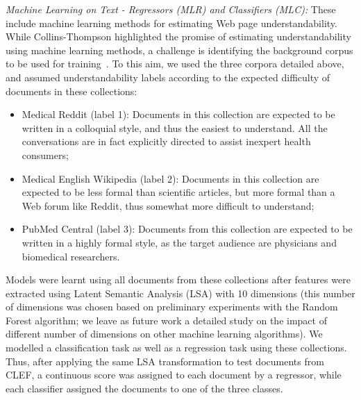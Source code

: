 

\textit{Machine Learning on Text - Regressors (MLR) and Classifiers (MLC):} These include machine learning methods for estimating Web page understandability. While Collins-Thompson highlighted the promise of estimating understandability using machine learning methods, a challenge is identifying the background corpus to be used for training~\cite{collins2014computational}. To this aim, we used the three corpora detailed above, and assumed understandability labels according to the expected difficulty of documents in these collections:

\begin{itemize}[leftmargin=*]
    \item Medical Reddit (label 1): Documents in this collection are expected to be written in a colloquial style, and thus the easiest to understand. All the conversations are in fact explicitly directed to assist inexpert health consumers;
    \item Medical English Wikipedia (label 2): Documents in this collection are expected to be less formal than scientific articles, but more formal than a Web forum like Reddit, thus somewhat more difficult to understand;
    \item PubMed Central (label 3): Documents from this collection are expected to be written in a highly formal style, as the target audience are physicians and biomedical researchers.
\end{itemize}

Models were learnt using all documents from these collections after features were extracted using Latent Semantic Analysis (LSA) with 10 dimensions (this number of dimensions was chosen based on preliminary experiments with the Random Forest algorithm; we leave as future work a detailed study on the impact of different number of dimensions on other machine learning algorithms). We modelled a classification task as well as a regression task using these collections. Thus, after applying the same LSA transformation to test documents from CLEF, a continuous score was assigned to each document by a regressor, while each classifier assigned the documents to one of the three classes. %




